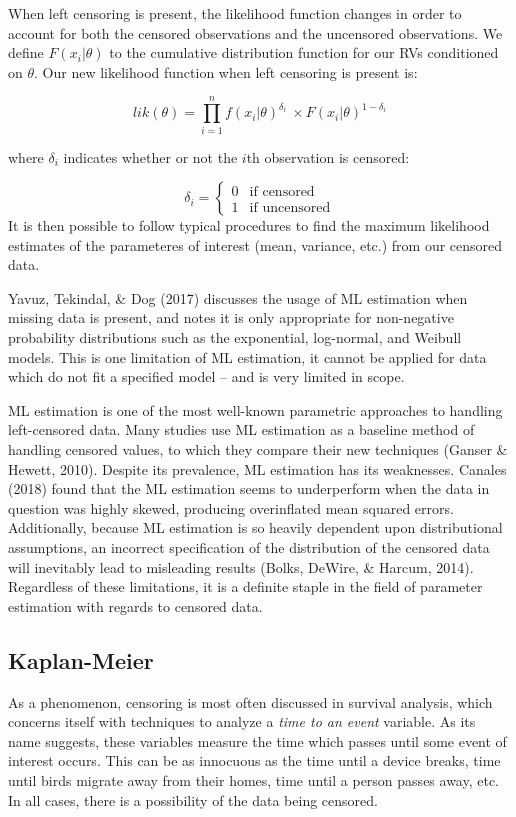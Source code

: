 \documentclass[12pt, twoside]{amherstthesis}
\begin{document}
When left censoring is present, the likelihood function changes in order to account for both the censored observations and the uncensored observations. We define \(F(x_i|\theta)\) to the cumulative distribution function for our RVs conditioned on \(\theta\). Our new likelihood function when left censoring is present is:

\[lik(\theta) = \prod_{i=1}^n f(x_i|\theta)^{\delta_{i}} \ \times F(x_i|\theta)^{1-{\delta_{i}}}\]

\noindent where \(\delta_{i}\) indicates whether or not the \(i\)th observation is censored:

\[\delta_i =
\begin{cases}
  0 & \text{if censored} \\
  1 & \text{if uncensored}
\end{cases}\]
It is then possible to follow typical procedures to find the maximum likelihood estimates of the parameteres of interest (mean, variance, etc.) from our censored data.

Yavuz, Tekindal, \& Dog (2017) discusses the usage of ML estimation when missing data is present, and notes it is only appropriate for non-negative probability distributions such as the exponential, log-normal, and Weibull models. This is one limitation of ML estimation, it cannot be applied for data which do not fit a specified model -- and is very limited in scope.

ML estimation is one of the most well-known parametric approaches to handling left-censored data. Many studies use ML estimation as a baseline method of handling censored values, to which they compare their new techniques (Ganser \& Hewett, 2010). Despite its prevalence, ML estimation has its weaknesses. Canales (2018) found that the ML estimation seems to underperform when the data in question was highly skewed, producing overinflated mean squared errors. Additionally, because ML estimation is so heavily dependent upon distributional assumptions, an incorrect specification of the distribution of the censored data will inevitably lead to misleading results (Bolks, DeWire, \& Harcum, 2014). Regardless of these limitations, it is a definite staple in the field of parameter estimation with regards to censored data.

\hypertarget{rkm}{%
\subsection{Kaplan-Meier}\label{rkm}}

As a phenomenon, censoring is most often discussed in survival analysis, which concerns itself with techniques to analyze a \emph{time to an event} variable. As its name suggests, these variables measure the time which passes until some event of interest occurs. This can be as innocuous as the time until a device breaks, time until birds migrate away from their homes, time until a person passes away, etc. In all cases, there is a possibility of the data being censored.
\end{document}
